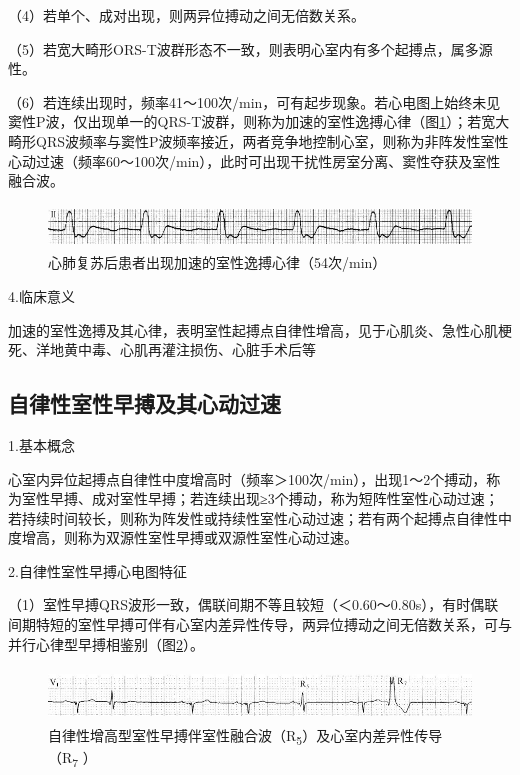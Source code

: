 （4）若单个、成对出现，则两异位搏动之间无倍数关系。

（5）若宽大畸形ORS-T波群形态不一致，则表明心室内有多个起搏点，属多源性。

（6）若连续出现时，频率41～100次/min，可有起步现象。若心电图上始终未见窦性P波，仅出现单一的QRS-T波群，则称为加速的室性逸搏心律（图\ref{fig15-8}）；若宽大畸形QRS波频率与窦性P波频率接近，两者竞争地控制心室，则称为非阵发性室性心动过速（频率60～100次/min），此时可出现干扰性房室分离、窦性夺获及室性融合波。

\begin{figure}[!htbp]
 \centering
 \includegraphics[width=5.58333in,height=0.45833in]{./images/Image00274.jpg}
 \captionsetup{justification=centering}
 \caption{心肺复苏后患者出现加速的室性逸搏心律（54次/min）}
 \label{fig15-8}
  \end{figure} 

4.临床意义

加速的室性逸搏及其心律，表明室性起搏点自律性增高，见于心肌炎、急性心肌梗死、洋地黄中毒、心肌再灌注损伤、心脏手术后等

\protect\hypertarget{text00022.htmlux5cux23subid272}{}{}

\subsection{自律性室性早搏及其心动过速}

1.基本概念

心室内异位起搏点自律性中度增高时（频率＞100次/min），出现1～2个搏动，称为室性早搏、成对室性早搏；若连续出现≥3个搏动，称为短阵性室性心动过速；若持续时间较长，则称为阵发性或持续性室性心动过速；若有两个起搏点自律性中度增高，则称为双源性室性早搏或双源性室性心动过速。

2.自律性室性早搏心电图特征

（1）室性早搏QRS波形一致，偶联间期不等且较短（＜0.60～0.80s），有时偶联间期特短的室性早搏可伴有心室内差异性传导，两异位搏动之间无倍数关系，可与并行心律型早搏相鉴别（图\ref{fig15-9}）。

\begin{figure}[!htbp]
 \centering
 \includegraphics[width=5.58333in,height=0.55208in]{./images/Image00275.jpg}
 \captionsetup{justification=centering}
 \caption{自律性增高型室性早搏伴室性融合波（R\textsubscript{5}）及心室内差异性传导（R\textsubscript{7} ）}
 \label{fig15-9}
  \end{figure} 


